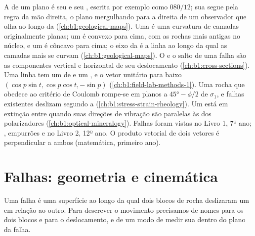 \begin{recall}
A  de um plano é seu  e seu , escrita por exemplo como $080/12$; sua  segue pela regra da mão direita, o plano mergulhando para a direita de um observador que olha ao longo da  (\cref{ch:b1:geological-maps}). Uma  é uma curvatura de camadas originalmente planas; um  é convexo para cima, com as rochas mais antigas no núcleo, e um  é côncavo para cima; o eixo da  é a linha ao longo da qual as camadas mais se curvam (\cref{ch:b1:geological-maps}). O  e o salto de uma falha são as componentes vertical e horizontal de seu deslocamento (\cref{ch:b1:cross-sections}). Uma linha tem um  de  e um , e o vetor unitário para baixo $(\cos p\sin t, \cos p\cos t, -\sin p)$ (\cref{ch:b1:field-lab-methods-1}). Uma rocha que obedece ao critério de Coulomb rompe-se em planos a $\ang{45} - \phi/2$ de $\sigma_1$, e falhas existentes deslizam segundo a  (\cref{ch:b1:stress-strain-rheology}). Um  está em extinção entre  quando suas direções de vibração são paralelas às dos polarizadores (\cref{ch:b1:optical-mineralogy}). Falhas foram vistas no Livro 1, 7º ano; , empurrões e  no Livro 2, 12º ano. O produto vetorial de dois vetores é perpendicular a ambos (matemática, primeiro ano).
\end{recall}

\section{Falhas: geometria e cinemática}\label{sec:b1:faults-folds-fabrics:faults}

Uma falha é uma superfície ao longo da qual dois blocos de rocha deslizaram um em relação ao outro. Para descrever o movimento precisamos de nomes para os dois blocos e para o deslocamento, e de um modo de medir sua  dentro do plano da falha.

